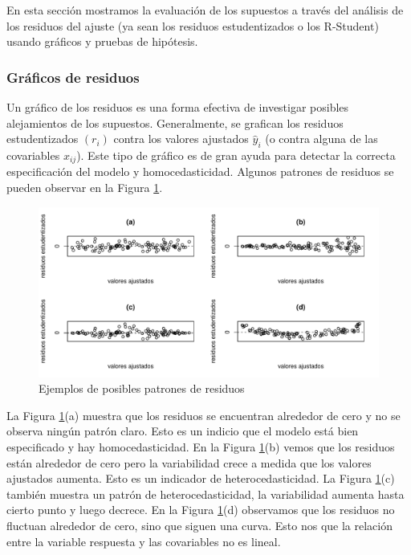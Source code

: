 \documentclass[
]{article}
\begin{document}
En esta sección mostramos la evaluación de los supuestos a través del análisis de los residuos del ajuste (ya sean los residuos estudentizados o los R-Student) usando gráficos y pruebas de hipótesis.

\hypertarget{gruxe1ficos-de-residuos}{%
\subsubsection{Gráficos de residuos}\label{gruxe1ficos-de-residuos}}

Un gráfico de los residuos es una forma efectiva de investigar posibles alejamientos de los supuestos. Generalmente, se grafican los residuos estudentizados \((r_{i})\) contra los valores ajustados \(\widehat{y}_{i}\) (o contra alguna de las covariables \(x_{ij}\)). Este tipo de gráfico es de gran ayuda para detectar la correcta especificación del modelo y homocedasticidad. Algunos patrones de residuos se pueden observar en la Figura \ref{fig:PatronesResiduos}.

\begin{figure}

{\centering \includegraphics{MLGI_files/figure-latex/PatronesResiduos-1} 

}

\caption{Ejemplos de posibles patrones de residuos}\label{fig:PatronesResiduos}
\end{figure}

La Figura \ref{fig:PatronesResiduos}(a) muestra que los residuos se encuentran alrededor de cero y no se observa ningún patrón claro. Esto es un indicio que el modelo está bien especificado y hay homocedasticidad. En la Figura \ref{fig:PatronesResiduos}(b) vemos que los residuos están alrededor de cero pero la variabilidad crece a medida que los valores ajustados aumenta. Esto es un indicador de heterocedasticidad. La Figura \ref{fig:PatronesResiduos}(c) también muestra un patrón de heterocedasticidad, la variabilidad aumenta hasta cierto punto y luego decrece. En la Figura \ref{fig:PatronesResiduos}(d) observamos que los residuos no fluctuan alrededor de cero, sino que siguen una curva. Esto nos que la relación entre la variable respuesta y las covariables no es lineal.
\end{document}
